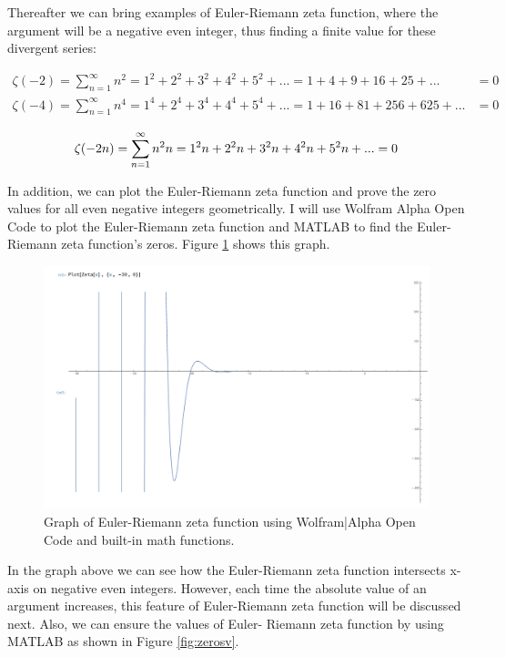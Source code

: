 \documentclass[a4paper]{article}
\begin{document}
Thereafter we can bring examples of Euler-Riemann zeta function, where the argument will be a
negative even integer, thus finding a finite value for these divergent series:

\begin{align*}
  \zeta(-2)=\sum_{n=1}^{\infty} n^2=1^2+2^2+3^2+4^2+5^2+...=1+4+9+16+25+...&=0\\
  \zeta(-4)=\sum_{n=1}^{\infty} n^4=1^4+2^4+3^4+4^4+5^4+...=1+16+81+256+625+...&=0
\end{align*}

\begin{equation}
\zeta(-2n)=\sum_{n=1}^{\infty} n^2n=1^2n+2^2n+3^2n+4^2n+5^2n+...=0\\  
  \end{equation}

In addition, we can plot the Euler-Riemann zeta function and prove the zero values for all even
negative integers geometrically. I will use Wolfram Alpha Open Code to plot the Euler-Riemann
zeta function and MATLAB to find the Euler-Riemann zeta function's zeros. Figure \ref{fig:zeros} shows this graph.

\begin{figure}[h!]
  \includegraphics[width=\textwidth]{zeros.png}
  \begin{center}
  \caption{Graph of Euler-Riemann zeta function using
Wolfram|Alpha Open Code and built-in math functions.}
    \label{fig:zeros}
  \end{center}
  \end{figure}

In the graph above we can see how the Euler-Riemann zeta function intersects x-axis on negative
even integers. However, each time the absolute value of an argument increases, this feature of
Euler-Riemann zeta function will be discussed next. Also, we can ensure the values of Euler-
Riemann zeta function by using MATLAB as shown in Figure \ref{fig:zerosv}.
\end{document}
